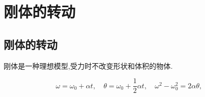 \chapter{刚体的转动}
\vspace*{-2em}
\thispagestyle{empty}
\section{刚体的转动}
\vspace*{-1em}
 刚体是一种理想模型,受力时不改变形状和体积的物体.\jg
{}
\par {}
\begin{equation}
\omega = \omega_0+\alpha t,\quad 
\theta =\omega_0 + \frac{1}{2}\alpha t,\quad 
\omega^2-\omega_0^2=2\alpha\theta,\quad 
\end{equation}

